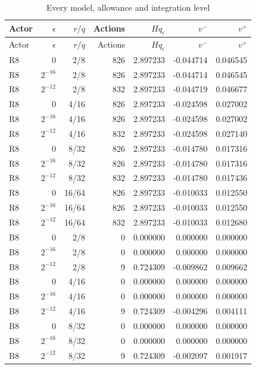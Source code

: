 {\footnotesize\setlength{\tabcolsep}{3pt}
\begin{longtable}{lrrrrrr}
\caption{Every model, allowance and integration level}\label{tab:sublevels82}\\
\hline
Actor & $\epsilon$ & $r/q$ & Actions & $Hq_\epsilon$ & $v^-$ & $v^+$ \\
\hline
\endfirsthead
\hline
Actor & $\epsilon$ & $r/q$ & Actions & $Hq_\epsilon$ & $v^-$ & $v^+$ \\
\hline
\endhead
R8 & $0$ & 2/8 & 826 & 2.897233 & -0.044714 & 0.046545 \\
R8 & $2^{-16}$ & 2/8 & 826 & 2.897233 & -0.044714 & 0.046545 \\
R8 & $2^{-12}$ & 2/8 & 832 & 2.897233 & -0.044719 & 0.046677 \\
R8 & $0$ & 4/16 & 826 & 2.897233 & -0.024598 & 0.027002 \\
R8 & $2^{-16}$ & 4/16 & 826 & 2.897233 & -0.024598 & 0.027002 \\
R8 & $2^{-12}$ & 4/16 & 832 & 2.897233 & -0.024598 & 0.027140 \\
R8 & $0$ & 8/32 & 826 & 2.897233 & -0.014780 & 0.017316 \\
R8 & $2^{-16}$ & 8/32 & 826 & 2.897233 & -0.014780 & 0.017316 \\
R8 & $2^{-12}$ & 8/32 & 832 & 2.897233 & -0.014780 & 0.017436 \\
R8 & $0$ & 16/64 & 826 & 2.897233 & -0.010033 & 0.012550 \\
R8 & $2^{-16}$ & 16/64 & 826 & 2.897233 & -0.010033 & 0.012550 \\
R8 & $2^{-12}$ & 16/64 & 832 & 2.897233 & -0.010033 & 0.012680 \\
B8 & $0$ & 2/8 & 0 & 0.000000 & 0.000000 & 0.000000 \\
B8 & $2^{-16}$ & 2/8 & 0 & 0.000000 & 0.000000 & 0.000000 \\
B8 & $2^{-12}$ & 2/8 & 9 & 0.724309 & -0.009862 & 0.009662 \\
B8 & $0$ & 4/16 & 0 & 0.000000 & 0.000000 & 0.000000 \\
B8 & $2^{-16}$ & 4/16 & 0 & 0.000000 & 0.000000 & 0.000000 \\
B8 & $2^{-12}$ & 4/16 & 9 & 0.724309 & -0.004296 & 0.004111 \\
B8 & $0$ & 8/32 & 0 & 0.000000 & 0.000000 & 0.000000 \\
B8 & $2^{-16}$ & 8/32 & 0 & 0.000000 & 0.000000 & 0.000000 \\
B8 & $2^{-12}$ & 8/32 & 9 & 0.724309 & -0.002097 & 0.001917 \\

\end{longtable}}
